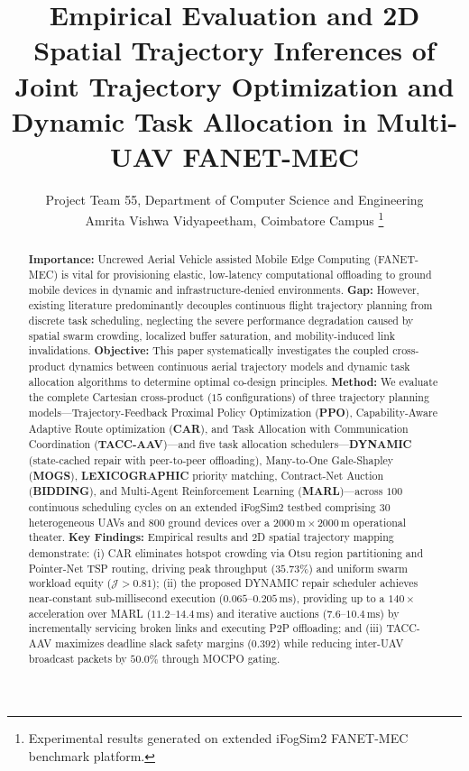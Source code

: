 \documentclass[journal]{IEEEtran}
\begin{document}
\title{Empirical Evaluation and 2D Spatial Trajectory Inferences of Joint Trajectory Optimization and Dynamic Task Allocation in Multi-UAV FANET-MEC}

\author{Project Team 55, Department of Computer Science and Engineering\\
Amrita Vishwa Vidyapeetham, Coimbatore Campus%
\thanks{Experimental results generated on extended iFogSim2 FANET-MEC benchmark platform.}}

\maketitle

\begin{abstract}
\textbf{Importance:} Uncrewed Aerial Vehicle assisted Mobile Edge Computing (FANET-MEC) is vital for provisioning elastic, low-latency computational offloading to ground mobile devices in dynamic and infrastructure-denied environments.
\textbf{Gap:} However, existing literature predominantly decouples continuous flight trajectory planning from discrete task scheduling, neglecting the severe performance degradation caused by spatial swarm crowding, localized buffer saturation, and mobility-induced link invalidations.
\textbf{Objective:} This paper systematically investigates the coupled cross-product dynamics between continuous aerial trajectory models and dynamic task allocation algorithms to determine optimal co-design principles.
\textbf{Method:} We evaluate the complete Cartesian cross-product ($15$ configurations) of three trajectory planning models---Trajectory-Feedback Proximal Policy Optimization (\textbf{PPO}), Capability-Aware Adaptive Route optimization (\textbf{CAR}), and Task Allocation with Communication Coordination (\textbf{TACC-AAV})---and five task allocation schedulers---\textbf{DYNAMIC} (state-cached repair with peer-to-peer offloading), Many-to-One Gale-Shapley (\textbf{MOGS}), \textbf{LEXICOGRAPHIC} priority matching, Contract-Net Auction (\textbf{BIDDING}), and Multi-Agent Reinforcement Learning (\textbf{MARL})---across $100$ continuous scheduling cycles on an extended iFogSim2 testbed comprising $30$ heterogeneous UAVs and $800$ ground devices over a $2000\,\text{m} \times 2000\,\text{m}$ operational theater.
\textbf{Key Findings:} Empirical results and 2D spatial trajectory mapping demonstrate: (i) CAR eliminates hotspot crowding via Otsu region partitioning and Pointer-Net TSP routing, driving peak throughput ($35.73\%$) and uniform swarm workload equity ($\mathcal{J} > 0.81$); (ii) the proposed DYNAMIC repair scheduler achieves near-constant sub-millisecond execution ($0.065$--$0.205\,\text{ms}$), providing up to a $140\times$ acceleration over MARL ($11.2$--$14.4\,\text{ms}$) and iterative auctions ($7.6$--$10.4\,\text{ms}$) by incrementally servicing broken links and executing P2P offloading; and (iii) TACC-AAV maximizes deadline slack safety margins ($0.392$) while reducing inter-UAV broadcast packets by $50.0\%$ through MOCPO gating.

\end{abstract}
\end{document}
